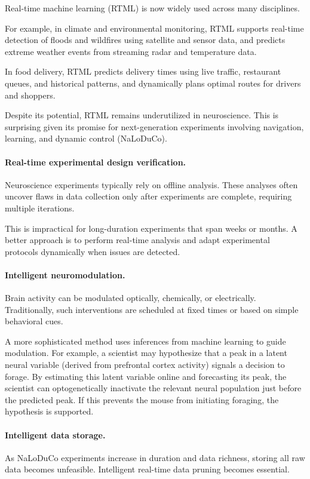 
Real-time machine learning (RTML) is now widely used across many disciplines.

For example, in climate and environmental monitoring, RTML supports real-time detection of floods and wildfires using satellite and sensor data, and predicts extreme weather events from streaming radar and temperature data.

In food delivery, RTML predicts delivery times using live traffic, restaurant queues, and historical patterns, and dynamically plans optimal routes for drivers and shoppers.

Despite its potential, RTML remains underutilized in neuroscience. This is surprising given its promise for next-generation experiments involving navigation, learning, and dynamic control (NaLoDuCo).

\paragraph{Real-time experimental design verification.}
Neuroscience experiments typically rely on offline analysis. These analyses often uncover flaws in data collection only after experiments are complete, requiring multiple iterations.

This is impractical for long-duration experiments that span weeks or months. A better approach is to perform real-time analysis and adapt experimental protocols dynamically when issues are detected.

\paragraph{Intelligent neuromodulation.}
Brain activity can be modulated optically, chemically, or electrically. Traditionally, such interventions are scheduled at fixed times or based on simple behavioral cues.

A more sophisticated method uses inferences from machine learning to guide modulation. For example, a scientist may hypothesize that a peak in a latent neural variable (derived from prefrontal cortex activity) signals a decision to forage. By estimating this latent variable online and forecasting its peak, the scientist can optogenetically inactivate the relevant neural population just before the predicted peak. If this prevents the mouse from initiating foraging, the hypothesis is supported.

\paragraph{Intelligent data storage.}
As NaLoDuCo experiments increase in duration and data richness, storing all raw data becomes unfeasible. Intelligent real-time data pruning becomes essential.

